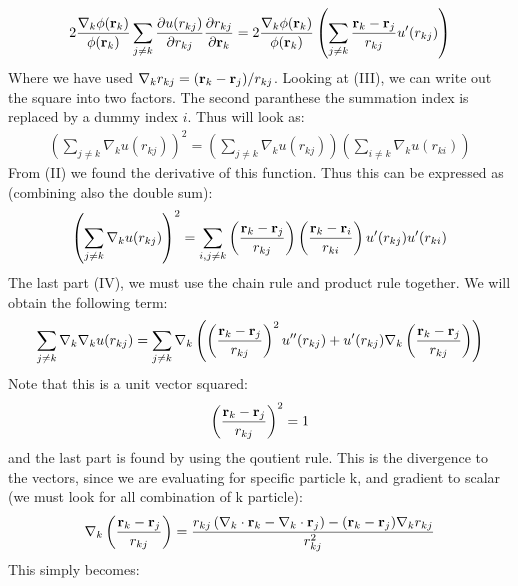 \documentclass[a4paper, 10pt]{article}
\begin{document}
\begin{appendices}
		\begin{align*}
		2\frac{\nabla_{k}\phi(\bold{r}_{k})}{\phi{(\bold{r}_{k})}}\sum_{j\neq k}\pdv{u(r_{kj})}{r_{kj}}\pdv{r_{kj}}{\bold{r}_{k}} =
		2\frac{\nabla_{k}\phi(\bold{r}_{k})}{\phi{(\bold{r}_{k})}}\left(\sum_{j\neq k}\frac{\bold{r}_{k} - \bold{r}_{j}}{r_{kj}}u'(r_{kj})\right)
		\end{align*}
		Where we have used $\nabla_{k} r_{kj} = (\bold{r}_{k} - \bold{r}_{j})/r_{kj}$.
		Looking at (III), we can write out the square into two factors. The second paranthese the summation index is replaced by a
		dummy index $i$. Thus will look as:
		\begin{align}
		\left(\sum_{j\neq k}\nabla_{k} u(r_{kj})\right)^2 = \left(\sum_{j\neq k}\nabla_{k} u(r_{kj})\right)\left(\sum_{i\neq k}\nabla_{k} u(r_{ki})\right)
		\end{align}
		From (II) we found the derivative of this function. Thus this can be expressed as (combining also the double sum):
		\begin{align}
		\left(\sum_{j\neq k}\nabla_{k} u(r_{kj})\right)^2 =
		\sum_{i, j\neq k}\left(\frac{\bold{r}_{k} - \bold{r}_{j}}{r_{kj}}\right)
		\left(\frac{\bold{r}_{k} - \bold{r}_{i}}{r_{ki}}\right)u'(r_{kj})u'(r_{ki})
		\end{align}
		The last part (IV), we must use the chain rule and product rule together. We will obtain
		the following term:
		\begin{align}
		\sum_{j \neq k}\nabla_{k}\nabla_{k}u(r_{kj}) =
		\sum_{j \neq k}\nabla_{k}\left(
		\left(\frac{\bold{r}_{k} - \bold{r}_{j}}{r_{kj}}\right)^2 u''(r_{kj}) + u'(r_{kj})\nabla_{k}
		\left(\frac{\bold{r}_{k} - \bold{r}_{j}}{r_{kj}}\right)\right)
		\end{align}
		Note that this is a unit vector squared:
		\begin{align}
		\left(\frac{\bold{r}_{k} - \bold{r}_{j}}{r_{kj}}\right)^2 = 1
		\end{align}
		and the last part is found by using the qoutient rule. This is the divergence to the vectors, since we are evaluating for
		specific particle k, and gradient to scalar (we must look for all combination of k particle):
		\begin{align}
		\nabla_{k}
		\left(\frac{\bold{r}_{k} - \bold{r}_{j}}{r_{kj}}\right)
		= \frac{r_{kj}\left(\nabla_{k}\cdot\bold{r}_{k}-
			\nabla_{k}\cdot\bold{r}_{j}\right) -
			(\bold{r}_{k}-\bold{r}_{j})\nabla_{k}r_{kj}}{r_{kj}^2}
		\end{align}
		This simply becomes:
		\begin{align}

\end{align}
\end{appendices}
\end{document}
